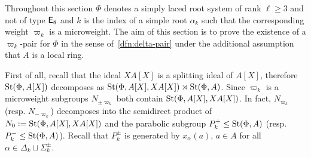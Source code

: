 Throughout this section $\Phi$ denotes a simply laced root system of rank $\ell \geq 3$ and not of type $\mathsf{E}_8$ and $k$ is the index of
 a simple root $\alpha_k$ such that the corresponding weight $\varpi_k$ is a microweight.
The aim of this section is to prove the existence of a $\varpi_k$-pair for $\Phi$ in the sense of~\cref{dfn:delta-pair}
 under the additional assumption that $A$ is a local ring.

First of all, recall that the ideal $XA[X]$ is a splitting ideal of $A[X]$, therefore
$\operatorname{St}(\Phi, A[X])$ decomposes as $\operatorname{St}(\Phi, A[X], XA[X]) \rtimes \operatorname{St}(\Phi, A)$.
Since $\varpi_k$ is a microweight subgroups $N_{\pm \varpi_k}$ both contain $\operatorname{St}(\Phi, A[X], XA[X])$.
In fact, $N_{\varpi_k}$ (resp. $N_{-\varpi_k}$) decomposes into the semidirect product of $N_0 := \operatorname{St}(\Phi, A[X], XA[X])$ and the parabolic subgroup $P_k^+ \leq \operatorname{St}(\Phi, A)$ (resp. $P_k^-\leq \operatorname{St}(\Phi, A)$).
Recall that $P_k^\pm$ is generated by $x_\alpha(a)$, $a \in A$ for all $\alpha \in \Delta_k \sqcup \Sigma^\pm_k$.

